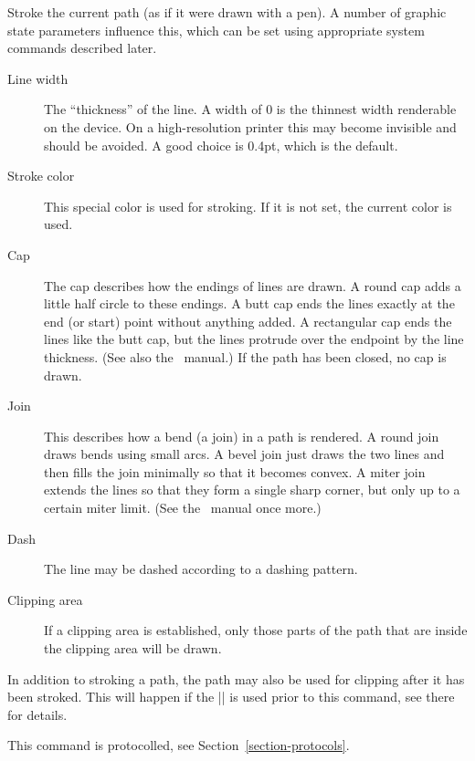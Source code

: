 \begin{command}{\pgfsys@stroke}
    Stroke the current path (as if it were drawn with a pen). A number of
    graphic state parameters influence this, which can be set using appropriate
    system commands described later.
    \begin{description}
        \item[Line width] The ``thickness'' of the line. A width of 0 is the
            thinnest width renderable on the device. On a high-resolution
            printer this may become invisible and should be avoided. A good
            choice is 0.4pt, which is the default.
        \item[Stroke color] This special color is used for stroking. If it is
            not set, the current color is used.
        \item[Cap] The cap describes how the endings of lines are drawn. A
            round cap adds a little half circle to these endings. A butt cap
            ends the lines exactly at the end (or start) point without anything
            added. A rectangular cap ends the lines like the butt cap, but the
            lines protrude over the endpoint by the line thickness. (See also
            the \pdf\ manual.) If the path has been closed, no cap is drawn.
        \item[Join] This describes how a bend (a join) in a path is rendered. A
            round join draws bends using small arcs. A bevel join just draws
            the two lines and then fills the join minimally so that it becomes
            convex. A miter join extends the lines so that they form a single
            sharp corner, but only up to a certain miter limit. (See the \pdf\
            manual once more.)
        \item[Dash] The line may be dashed according to a dashing pattern.
        \item[Clipping area] If a clipping area is established, only those
            parts of the path that are inside the clipping area will be drawn.
    \end{description}

    In addition to stroking a path, the path may also be used for clipping
    after it has been stroked. This will happen if the |\pgfsys@clipnext| is
    used prior to this command, see there for details.

    This command is protocolled, see Section~\ref{section-protocols}.
\end{command}

